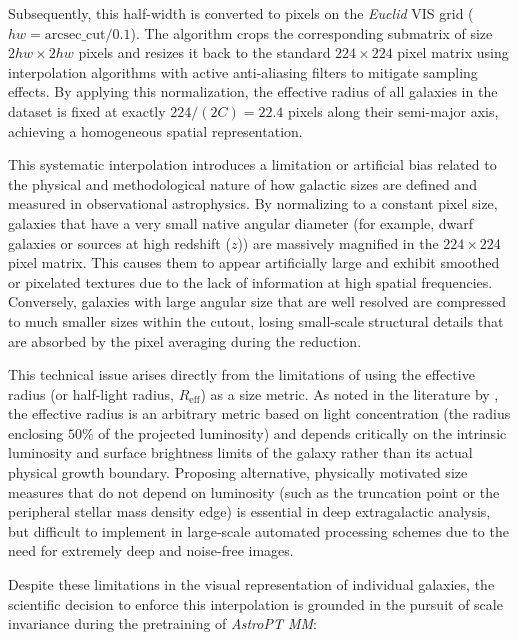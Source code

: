 Subsequently, this half-width is converted to pixels on the \textit{Euclid} VIS grid ($hw = \text{arcsec\_cut} / 0.1$). The algorithm crops the corresponding submatrix of size $2hw \times 2hw$ pixels and resizes it back to the standard $224 \times 224$ pixel matrix using interpolation algorithms with active anti-aliasing filters to mitigate sampling effects. By applying this normalization, the effective radius of all galaxies in the dataset is fixed at exactly $224 / \left(2 C\right) = 22.4$ pixels along their semi-major axis, achieving a homogeneous spatial representation.

This systematic interpolation introduces a limitation or artificial bias related to the physical and methodological nature of how galactic sizes are defined and measured in observational astrophysics. By normalizing to a constant pixel size, galaxies that have a very small native angular diameter (for example, dwarf galaxies or sources at high redshift ($z$)) are massively magnified in the $224 \times 224$ pixel matrix. This causes them to appear artificially large and exhibit smoothed or pixelated textures due to the lack of information at high spatial frequencies. Conversely, galaxies with large angular size that are well resolved are compressed to much smaller sizes within the cutout, losing small-scale structural details that are absorbed by the pixel averaging during the reduction.

This technical issue arises directly from the limitations of using the effective radius (or half-light radius, $R_{\text{eff}}$) as a size metric. As noted in the literature by \textcites{ar:trujillo-2020}{ar:buitrago-2024}, the effective radius is an arbitrary metric based on light concentration (the radius enclosing $50\%$ of the projected luminosity) and depends critically on the intrinsic luminosity and surface brightness limits of the galaxy rather than its actual physical growth boundary. Proposing alternative, physically motivated size measures that do not depend on luminosity (such as the truncation point or the peripheral stellar mass density edge) is essential in deep extragalactic analysis, but difficult to implement in large-scale automated processing schemes due to the need for extremely deep and noise-free images.

Despite these limitations in the visual representation of individual galaxies, the scientific decision to enforce this interpolation is grounded in the pursuit of scale invariance during the pretraining of \textit{AstroPT MM}:

